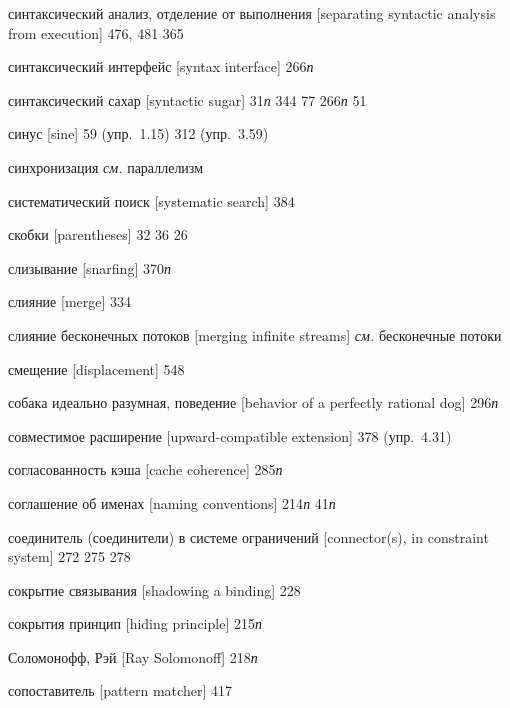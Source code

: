 \begin{theindex}
\item {синтаксический анализ, отделение от выполнения [separating syntactic analysis from execution]}
   476, 481
   365
\item {синтаксический интерфейс [syntax interface]} 266{\it п}
\item {синтаксический сахар [syntactic sugar]} 31{\it п}
   344
   77
   266{\it п}
   51
\item {синус [sine]}
   59 (упр.~1.15)
   312 (упр.~3.59)
\item {синхронизация} {\it см.} параллелизм
\item {систематический поиск [systematic search]} 384
\item {скобки [parentheses]}
   32
   36
   26
\item {слизывание [snarfing]} 370{\it п}
\item {слияние [merge]} 334
\item {слияние бесконечных потоков [merging infinite streams]} {\it см.} бесконечные потоки
\item {смещение [displacement]} 548
\item {собака идеально разумная, поведение [behavior of a perfectly rational dog]} 296{\it п}
\item {совместимое расширение [upward-compatible extension]} 378 (упр.~4.31)
\item {согласованность кэша [cache coherence]} 285{\it п}
\item {соглашение об именах [naming conventions]}
   214{\it п}
   41{\it п}
\item {соединитель (соединители) в системе ограничений [connector(s), in constraint system]} 272
   275
   278
\item {сокрытие связывания [shadowing a binding]} 228
\item {сокрытия принцип [hiding principle]} 215{\it п}
\item {Соломонофф, Рэй [Ray Solomonoff]} 218{\it п}
\item {сопоставитель [pattern matcher]} 417

\end{theindex}

